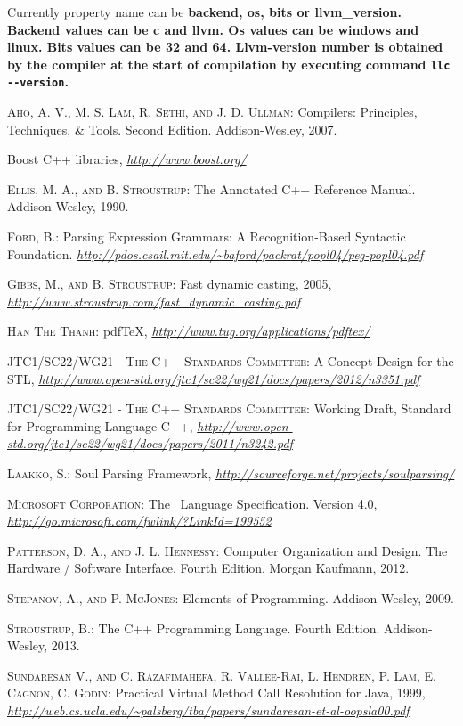 \documentclass[a4paper,oneside,11pt]{article}
\begin{document}
Currently property name can be \bf{backend}, \bf{os}, \bf{bits} or \bf{llvm\_version}.
Backend values can be \bf{c} and \bf{llvm}.
Os values can be \bf{windows} and \bf{linux}.
Bits values can be \bf{32} and \bf{64}.
Llvm-version number is obtained by the compiler at the start of compilation by executing command \verb|llc --version|.

\clearpage

\begin{thebibliography}{13}

 \textsc{Aho, A. V., M. S. Lam, R. Sethi, and J. D. Ullman}:
Compilers: Principles, Techniques, \& Tools. Second Edition. Addison-Wesley, 2007.

 Boost C++ libraries,
\textit{\url{http://www.boost.org/}}

 \textsc{Ellis, M. A., and B. Stroustrup}:
The Annotated C++ Reference Manual. Addison-Wesley, 1990.

 \textsc{Ford, B.}:
Parsing Expression Grammars: A Recognition-Based Syntactic Foundation.
\textit{\url{http://pdos.csail.mit.edu/~baford/packrat/popl04/peg-popl04.pdf}}

 \textsc{Gibbs, M., and B. Stroustrup}:
Fast dynamic casting, 2005,
\textit{\url{http://www.stroustrup.com/fast_dynamic_casting.pdf}}

 \textsc{Han The Thanh}:
pdf\TeX, \textit{\url{http://www.tug.org/applications/pdftex/}}

 \textsc{JTC1/SC22/WG21 - The C++ Standards Committee}:
A Concept Design for the STL,
\textit{\url{http://www.open-std.org/jtc1/sc22/wg21/docs/papers/2012/n3351.pdf}}

 \textsc{JTC1/SC22/WG21 - The C++ Standards Committee}:
Working Draft, Standard for Programming Language C++,
\textit{\url{http://www.open-std.org/jtc1/sc22/wg21/docs/papers/2011/n3242.pdf}}

 \textsc{Laakko, S.}:
Soul Parsing Framework,
\textit{\url{http://sourceforge.net/projects/soulparsing/}}

 \textsc{Microsoft Corporation}:
The \csharp\ Language Specification. Version 4.0,
\textit{\url{http://go.microsoft.com/fwlink/?LinkId=199552}}

 \textsc{Patterson, D. A., and J. L. Hennessy}:
Computer Organization and Design. The Hardware / Software Interface. Fourth Edition.
Morgan Kaufmann, 2012.

 \textsc{Stepanov, A., and P. McJones}:
Elements of Programming. Addison-Wesley, 2009.

 \textsc{Stroustrup, B.}:
The C++ Programming Language. Fourth Edition. Addison-Wesley, 2013.

 \textsc{Sundaresan V., and C. Razafimahefa, R. Vallee-Rai, L. Hendren, P. Lam, E. Cagnon, C. Godin}:
Practical Virtual Method Call Resolution for Java, 1999,
\textit{\url{http://web.cs.ucla.edu/~palsberg/tba/papers/sundaresan-et-al-oopsla00.pdf}}

\end{thebibliography}
\end{document}
